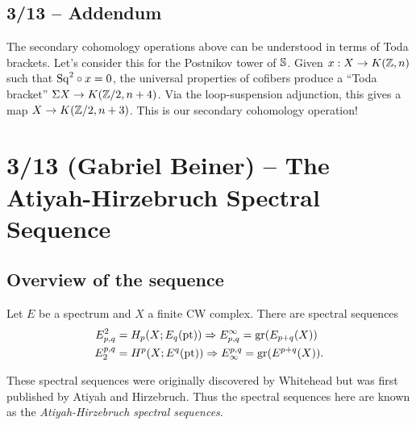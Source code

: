 \documentclass{article}
\begin{document}
\subsection{3/13 -- Addendum}

The secondary cohomology operations above can be understood in terms of Toda brackets.
Let's consider this for the Postnikov tower of $\mathbb{S}$.
Given $x: X \to K(\mathbb{Z}, n)$ such that $\mathrm{Sq}^2 \circ x = 0$, the universal properties of cofibers produce a ``Toda bracket'' $\Sigma X \to K(\mathbb{Z}/2, n+4)$.
Via the loop-suspension adjunction, this gives a map $X \to K(\mathbb{Z}/2, n+3)$.
This is our secondary cohomology operation!

\section{3/13 (Gabriel Beiner) -- The Atiyah-Hirzebruch Spectral Sequence}

\subsection{Overview of the sequence}

\begin{thm}[Whitehead]
	Let $E$ be a spectrum and $X$ a finite CW complex.
	There are spectral sequences
	\begin{align*}
		E^2_{p,q} &= H_p(X; E_q(\mathrm{pt})) \Rightarrow E^\infty_{p,q} = \operatorname{gr}(E_{p+q}(X)) \\
		E_2^{p,q} &= H^p(X; E^q(\mathrm{pt})) \Rightarrow E_\infty^{p,q} = \operatorname{gr}(E^{p+q}(X)).
	\end{align*}
\end{thm}

These spectral sequences were originally discovered by Whitehead but was first published by Atiyah and Hirzebruch.
Thus the spectral sequences here are known as the \emph{Atiyah-Hirzebruch spectral sequences}.
\end{document}

